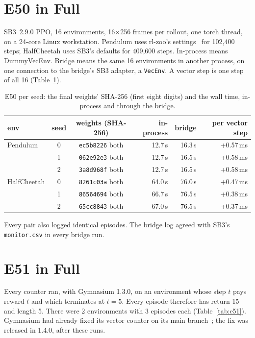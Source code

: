 \documentclass[conference]{IEEEtran}
\begin{document}
\section{E50 in Full}
\label{app:e50}

SB3~2.9.0 PPO, 16 environments, 16$\times$256 frames per rollout, one torch
thread, on a 24-core Linux workstation. Pendulum uses rl-zoo's
settings~\cite{raffin2020zoo} for 102,400 steps; HalfCheetah uses SB3's
defaults for 409,600 steps. In-process means DummyVecEnv. Bridge means the
same 16 environments in another process, on one connection to the bridge's
SB3 adapter, a \texttt{VecEnv}. A vector step is one step of all 16
(Table~\ref{tab:e50}).

\begin{table}[t]
\centering
\caption{E50 per seed: the final weights' SHA-256 (first eight digits) and
the wall time, in-process and through the bridge.}
\label{tab:e50}
\footnotesize
\setlength{\tabcolsep}{3pt}
\begin{tabular}{@{}lccrrr@{}}
\toprule
env & seed & weights (SHA-256) & in-process & bridge & per vector step \\
\midrule
Pendulum    & 0 & \texttt{ec5b8226} both & 12.7\,s & 16.3\,s & +0.57\,ms \\
            & 1 & \texttt{062e92e3} both & 12.7\,s & 16.5\,s & +0.58\,ms \\
            & 2 & \texttt{3a8d968f} both & 12.7\,s & 16.5\,s & +0.58\,ms \\
HalfCheetah & 0 & \texttt{8261c03a} both & 64.0\,s & 76.0\,s & +0.47\,ms \\
            & 1 & \texttt{86564694} both & 66.7\,s & 76.5\,s & +0.38\,ms \\
            & 2 & \texttt{65cc8843} both & 67.0\,s & 76.5\,s & +0.37\,ms \\
\bottomrule
\end{tabular}
\end{table}

Every pair also logged identical episodes. The bridge log agreed with SB3's
\texttt{monitor.csv} in every bridge run.

\section{E51 in Full}

Every counter ran, with Gymnasium 1.3.0, on an environment whose step $t$
pays reward $t$ and which terminates at $t=5$. Every episode therefore has
return 15 and length 5. There were 2 environments with 3 episodes each
(Table~\ref{tab:e51}). Gymnasium had already fixed its vector counter on
its main branch~\cite{gymnasium1624}; the fix was released in 1.4.0, after
these runs.
\end{document}
